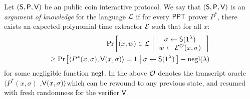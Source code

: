\begin{comment}
\subsection{Forking Lemma and Knowledge Soundness}
We use the Forking Lemma from \cite{InnerProductDLS,bulletproofs} to describe 
expected polynomial time knowledge extractors for our protocols. Let
$(\prover,\verifier)$ be a public coin $(2\mu+1)$-move interactive protocol with
challenges $x_1,\ldots,x_\mu$ in sequence. Let $n_i\geq 1$ for $1\leq i\leq
\mu$. We call a collection of $n=\prod_{i=1}^\mu n_i$ accepting transcripts to be
$(n_1,\ldots,n_\mu)$-tree of accepting transcripts, if the challenges are
organized in the tree format that we describe now: \commentA{the following didn't make sense. what does a path from root to a leaf node signify? one sequence of challenges for an accepting execution? at any rate this portion needs a clean write-up} The root of the tree is
labelled with the statement being proved. Each node of depth $i<\mu$ has exactly
$n_i$ children, each labelled with a distinct value of the $i^{th}$ challenge
$x_i$. We call a $\ppt$ algorithm $\chi$ to be a {\em witness extraction
algorithm} if $\chi$ can extract a witness $w$ to the statement, given an
appropriate tree of accepting transcripts. This can be seen as a generalization
of the notion of special soundness for Sigma protocols with $n=2$ and $\mu=1$.
\end{comment}
\begin{definition}\label{def:argofknowledge}
Let $(\mathsf{S},\mathsf{P},\mathsf{V})$ be an public coin interactive protocol. We say that
$(\mathsf{S},\mathsf{P},\mathsf{V})$ is an {\em argument of knowledge} for the language
$\mathcal{L}$ if for every $\mathsf{PPT}$
prover $P^\ast$, there exists an expected polynomial time extractor $\mathcal{E}$ such that for all $x$:
{\small
\begin{align*}
\condprob{(x,w)\in \mc{L}}{
\begin{array}{c}
\sigma\gets\setup(\secparam) \\
w\gets \extr^{\mc{O}}(x,\sigma)
\end{array}
}\\
\geq \condprob{\langle
P^\ast(x,\sigma),\verifier(x,\sigma)\rangle=1}{\sigma\gets \setup(\secparam)} -
\negl(\lambda)
\end{align*}}
for some negligible function $\mathrm{negl}$. In the above $\mathcal{O}$ denotes the transcript oracle  $\langle P^\ast(x,\sigma)$ ,$\mathsf{V}(x,\sigma)\rangle$which can be rewound to any previous state, and resumed with fresh randomness for the
verifier $\mathsf{V}$.
\end{definition}


